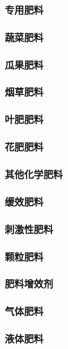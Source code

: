 \documentclass[UTF8]{../../ApplicationUniverse}
\begin{document}
\subsubsection{专用肥料}
    \subsubsection{蔬菜肥料}
    \subsubsection{瓜果肥料}
    \subsubsection{烟草肥料}
    \subsubsection{叶肥肥料}
    \subsubsection{花肥肥料}
\subsubsection{其他化学肥料}
    \subsubsection{缓效肥料}
    \subsubsection{刺激性肥料}
    \subsubsection{颗粒肥料}
    \subsubsection{肥料增效剂}
    \subsubsection{气体肥料}
    \subsubsection{液体肥料}





 
\end{document}
